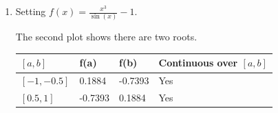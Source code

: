 \documentclass[a4paper,11pt]{article}
\begin{document}
\begin{enumerate}
\begin{enumerate}
			
		\item Setting $f(x) = \frac{x^{3}}{\sin(x)} - 1$.
			
		The second plot shows there are two roots. 
		\begin{center}
			\begin{tabular}{l|lll}
				$[a,b]$     & f(a)    & f(b)    & Continuous over $[a,b]$ \\ 
				\hline
				$[-1,-0.5]$ & 0.1884  & -0.7393 & Yes                     \\
				$[0.5,1]$   & -0.7393 & 0.1884  & Yes                    
				\end{tabular}
		\end{center}
		

\end{enumerate}
\end{enumerate}
\end{document}
